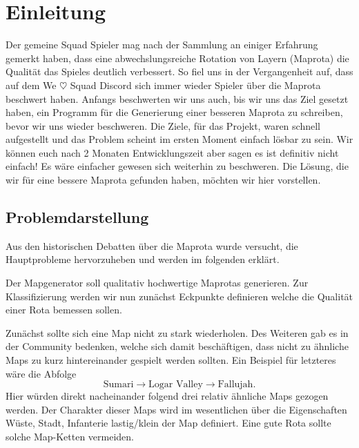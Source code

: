 \section{Einleitung}

        Der gemeine Squad Spieler mag nach der Sammlung an einiger Erfahrung gemerkt haben, dass eine abwechslungsreiche Rotation von Layern (Maprota)
        die Qualität das Spieles deutlich verbessert. So fiel uns in der Vergangenheit auf, dass auf dem We $\heartsuit$ Squad Discord sich immer wieder
        Spieler über die Maprota beschwert haben. Anfangs beschwerten wir uns auch, bis wir uns das Ziel gesetzt haben, ein Programm
        für die Generierung einer besseren Maprota zu schreiben, bevor wir uns wieder beschweren.
        Die Ziele, für das Projekt, waren schnell aufgestellt und das Problem scheint im ersten Moment einfach lösbar zu sein.
        Wir können euch nach 2 Monaten Entwicklungszeit aber sagen es ist definitiv nicht einfach! Es wäre einfacher gewesen sich weiterhin zu beschweren.
        Die Lösung, die wir für eine bessere Maprota gefunden haben, möchten wir hier vorstellen.

        \subsection{Problemdarstellung}
            Aus den historischen Debatten über die Maprota wurde versucht, die Hauptprobleme hervorzuheben und werden im folgenden erklärt.

            Der Mapgenerator soll qualitativ hochwertige Maprotas generieren.
            Zur Klassifizierung werden wir nun zunächst Eckpunkte definieren welche die Qualität einer Rota bemessen sollen.

            Zunächst sollte sich eine Map nicht zu stark wiederholen.
            Des Weiteren gab es in der Community bedenken, welche sich damit beschäftigen, dass nicht zu ähnliche Maps zu kurz hintereinander gespielt werden sollten.
            Ein Beispiel für letzteres wäre die Abfolge
            \begin{equation*}
                \text{Sumari} \rightarrow \text{Logar Valley} \rightarrow \text{Fallujah}.
            \end{equation*}
            Hier würden direkt nacheinander folgend drei relativ ähnliche Maps gezogen werden.
            Der Charakter dieser Maps wird im wesentlichen über die Eigenschaften \glqq{}Wüste\grqq{}, \glqq{}Stadt\grqq{}, \glqq{}Infanterie lastig/klein\grqq{} der Map definiert.
            Eine gute Rota sollte solche Map-Ketten vermeiden.

